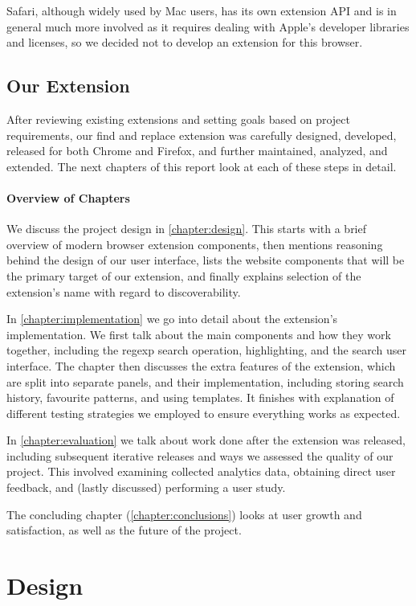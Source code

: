 \documentclass[bsc,frontabs,twoside,singlespacing,parskip,deptreport]{infthesis}
\begin{document}
Safari, although widely used by Mac users, has its own extension API and is in general much more involved as it requires dealing with Apple's developer libraries and licenses, so we decided not to develop an extension for this browser.

\section{Our Extension}
After reviewing existing extensions and setting goals based on project requirements, our find and replace extension was carefully designed, developed, released for both Chrome and Firefox, and further maintained, analyzed, and extended. The next chapters of this report look at each of these steps in detail.

\subsubsection*{Overview of Chapters}
We discuss the project design in \autoref{chapter:design}. This starts with a brief overview of modern browser extension components, then mentions reasoning behind the design of our user interface, lists the website components that will be the primary target of our extension, and finally explains selection of the extension's name with regard to discoverability.

In \autoref{chapter:implementation} we go into detail about the extension's implementation. We first talk about the main components and how they work together, including the regexp search operation, highlighting, and the search user interface. The chapter then discusses the extra features of the extension, which are split into separate panels, and their implementation, including storing search history, favourite patterns, and using templates. It finishes with explanation of different testing strategies we employed to ensure everything works as expected.

In \autoref{chapter:evaluation} we talk about work done after the extension was released, including subsequent iterative releases and ways we assessed the quality of our project. This involved examining collected analytics data, obtaining direct user feedback, and (lastly discussed) performing a user study.

The concluding chapter (\autoref{chapter:conclusions}) looks at user growth and satisfaction, as well as the future of the project.

\chapter{Design}
\label{chapter:design}
\end{document}
